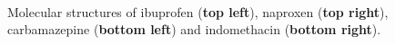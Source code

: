 	\begin{figure}[htb!]
		\hspace{1.2cm}
		\hspace{2cm}
		\\
		\vspace{-0.5cm}
		\caption{Molecular structures of ibuprofen (\textbf{top left}), naproxen (\textbf{top right}), carbamazepine (\textbf{bottom left}) and indomethacin (\textbf{bottom right}).}
		\label{fig:APIs}
	\end{figure}


